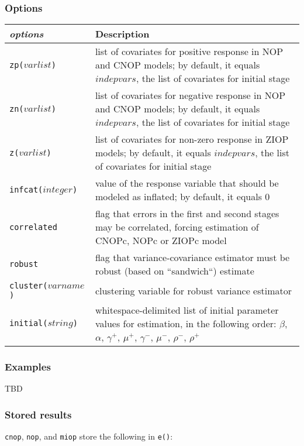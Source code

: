 \documentclass[letterpaper,fleqn,11pt]{article}
\begin{document}
\begin{onehalfspace}
\subsubsection*{Options}

\begin{tabular}{lp{12cm}}
\textit{options} & Description \\ 
\midrule \texttt{zp($varlist$)} & list of covariates for positive response
in NOP and CNOP models; by default, it equals $indepvars$, the list of
covariates for initial stage \\ 
\texttt{zn($varlist$)} & list of covariates for negative response in NOP and
CNOP models; by default, it equals $indepvars$, the list of covariates for
initial stage \\ 
\texttt{z($varlist$)} & list of covariates for non-zero response in ZIOP
models; by default, it equals $indepvars$, the list of covariates for
initial stage \\ 
\texttt{infcat($integer$)} & value of the response variable that should be
modeled as inflated; by default, it equals 0 \\ 
\texttt{correlated} & flag that errors in the first and second stages may be
correlated, forcing estimation of CNOPc, NOPc or ZIOPc model \\ 
\texttt{robust} & flag that variance-covariance estimator must be robust
(based on ``sandwich``) estimate \\ 
\texttt{cluster($varname$)} & clustering variable for robust variance
estimator \\ 
\texttt{initial($string$)} & whitespace-delimited list of initial parameter
values for estimation, in the following order: $\beta$, $\alpha$, $\gamma^{+}
$, $\mu^{+}$, $\gamma^{-}$, $\mu^{-}$, $\rho^{-}$, $\rho^{+}$%
\end{tabular}

\subsubsection*{Examples}

TBD

\subsubsection*{Stored results}

\texttt{cnop}, \texttt{nop}, and \texttt{miop} store the following in 
\texttt{e()}:



\end{onehalfspace}
\end{document}
